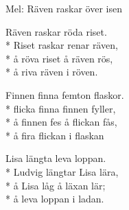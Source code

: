 \begin{SongText}
    \begin{SongInfo}
        Mel: Räven raskar över isen
    \end{SongInfo}
    \begin{SongVerse}
        Räven raskar röda riset.\\*%
        Riset raskar renar räven,\\*%
        å röva riset å räven rös,\\*%
        å riva räven i röven.
    \end{SongVerse}
    \begin{SongVerse}
        Finnen finna femton flaskor.\\*%
        flicka finna finnen fyller,\\*%
        å finnen fes å flickan fås,\\*%
        å fira flickan i flaskan
    \end{SongVerse}
    \begin{SongVerse}
        Lisa längta leva loppan.\\*%
        Ludvig längtar Lisa lära,\\*%
        å Lisa låg å läxan lär;\\*%
        å leva loppan i ladan.
    \end{SongVerse}
\end{SongText}
